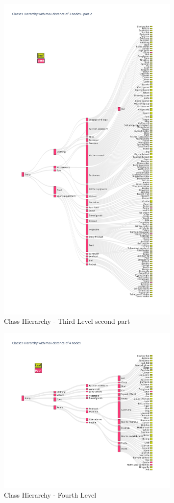 \documentclass[11pt, a4paper, twocolumn]{article}
\begin{document}
\begin{appendices}
\begin{figure}[ht]
		\includegraphics[width=0.8\textwidth]{lvl3_classes_pt2.png}
		\caption{\scriptsize Class Hierarchy - Third Level second part}
	\end{figure}
	
	\begin{figure}[ht]
		\centering
		\includegraphics[width=0.8\textwidth]{lvl4_classes.png}
		\caption{\scriptsize Class Hierarchy - Fourth Level}
	\end{figure}
	

\end{appendices}
\end{document}
